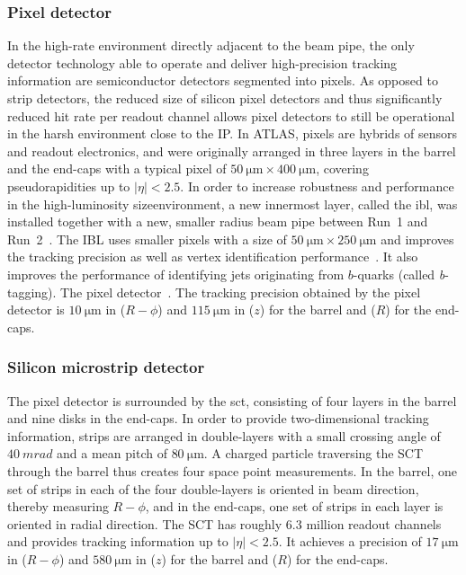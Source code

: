 \subsubsection{Pixel detector}

In the high-rate environment directly adjacent to the beam pipe, the only detector technology able to operate and deliver high-precision tracking information are semiconductor detectors segmented into pixels. As opposed to strip detectors, the reduced size of silicon pixel detectors and thus significantly reduced hit rate per readout channel allows pixel detectors to still be operational in the harsh environment close to the IP. In ATLAS, pixels are hybrids of sensors and readout electronics, and were originally arranged in three layers in the barrel and the end-caps with a typical pixel of $\SI{50}{\micro\meter}\times \SI{400}{\micro\meter}$, covering pseudorapidities up to $\vert\eta\vert < 2.5$. In order to increase robustness  and performance in the high-luminosity sizeenvironment, a new innermost layer, called the \gls{ibl}, was installed together with a new, smaller radius beam pipe between Run~1 and Run~2~\cite{Abbott:2018ikt,Capeans:1291633}. The IBL uses smaller pixels with a size of $\SI{50}{\micro\meter}\times \SI{250}{\micro\meter}$ and improves the tracking precision as well as vertex identification performance~\cite{Capeans:1291633}. It also improves the performance of identifying jets originating from $b$-quarks (called \textit{b}-tagging). The pixel detector~\cite{Aad:2019aic}. The tracking precision obtained by the pixel detector is $\SI{10}{\micro\meter}$ in ($R-\phi$) and $\SI{115}{\micro\meter}$ in ($z$) for the barrel and ($R$) for the end-caps.

\subsubsection{Silicon microstrip detector}

The pixel detector is surrounded by the \gls{sct}, consisting of four layers in the barrel and nine disks in the end-caps. In order to provide two-dimensional tracking information, strips are arranged in double-layers with a small crossing angle of $\SI{40}{mrad}$ and a mean pitch of $\SI{80}{\micro\meter}$. A charged particle traversing the SCT through the barrel thus creates four space point measurements. In the barrel, one set of strips in each of the four double-layers is oriented in beam direction, thereby measuring $R-\phi$, and in the end-caps, one set of strips in each layer is oriented in radial direction. The SCT has roughly $6.3$ million readout channels and provides tracking information up to $\vert\eta\vert <2.5$. It achieves a precision of $\SI{17}{\micro\meter}$ in ($R-\phi$) and $\SI{580}{\micro\meter}$ in ($z$) for the barrel and ($R$) for the end-caps.

